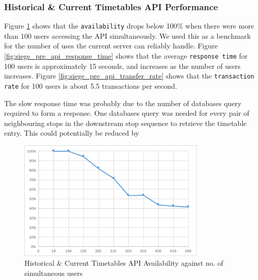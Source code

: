 \subsubsection{Historical \& Current Timetables API Performance}

\par Figure \ref{fig:siege_pre_api_availability} shows that the \texttt{availability} drops below 100\% when there were more than 100 users accessing the API simultaneously. We used this as a benchmark for the number of uses the current server can reliably handle. Figure \ref{fig:siege_pre_api_response_time} shows that the average \texttt{response time} for 100 users is approximately 15 seconds, and increases as the number of users increases. Figure \ref{fig:siege_pre_api_transfer_rate} shows that the \texttt{transaction rate} for 100 users is about 5.5 transactions per second.

\par The slow response time was probably due to the number of databases query required to form a response. One databases query was needed for every pair of neighbouring stops in the downstream stop sequence to retrieve the timetable entry. This could potentially be reduced by

\begin{figure}
\centering
\includegraphics[width=0.8\textwidth]{figures/siege_predictions_api_availability_against_users.pdf}
\caption{\label{fig:siege_pre_api_availability} Historical \& Current Timetables API Availability against no. of simultaneous users}
\end{figure}

